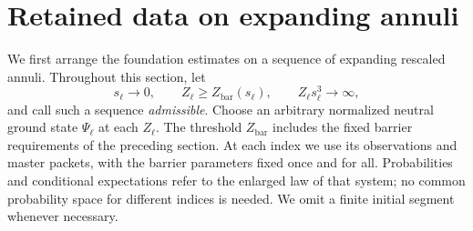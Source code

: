 \section{Retained data on expanding annuli}
\label{sec:scales}

We first arrange the foundation estimates on a sequence of expanding rescaled
annuli.  Throughout this section, let
\begin{equation}
 s_\ell\longrightarrow0,\qquad
 Z_\ell\ge Z_{\mathrm{bar}}(s_\ell),\qquad
 Z_\ell s_\ell^3\longrightarrow\infty,
 \label{scales:admissible}
\end{equation}
and call such a sequence \emph{admissible}. Choose an arbitrary
normalized neutral ground state $\Psi_\ell$ at each
$Z_\ell$.  The threshold $Z_{\mathrm{bar}}$ includes the fixed barrier
requirements of the preceding section.  At each index we use its observations
and master packets, with the barrier parameters fixed once and for all.
Probabilities and conditional expectations refer to the enlarged law of that
system; no common probability space for different indices is needed.  We omit
a finite initial segment whenever necessary.

